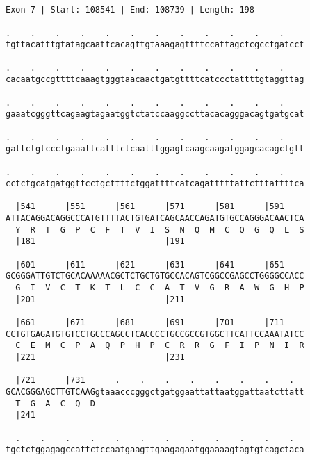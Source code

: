 \documentclass{article}
\begin{document}
\begin{Verbatim}
                                    
 
Exon 7 | Start: 108541 | End: 108739 | Length: 198
 
.    .    .    .    .    .    .    .    .    .    .    .    
tgttacatttgtatagcaattcacagttgtaaagagttttccattagctcgcctgatcct
                                                            
.    .    .    .    .    .    .    .    .    .    .    .    
cacaatgccgttttcaaagtgggtaacaactgatgttttcatccctattttgtaggttag
                                                            
.    .    .    .    .    .    .    .    .    .    .    .    
gaaatcgggttcagaagtagaatggtctatccaaggccttacacagggacagtgatgcat
                                                            
.    .    .    .    .    .    .    .    .    .    .    .    
gattctgtccctgaaattcatttctcaatttggagtcaagcaagatggagcacagctgtt
                                                            
.    .    .    .    .    .    .    .    .    .    .    .    
cctctgcatgatggttcctgcttttctggattttcatcagatttttattctttattttca
                                                            
  |541      |551      |561      |571      |581      |591    
ATTACAGGACAGGCCCATGTTTTACTGTGATCAGCAACCAGATGTGCCAGGGACAACTCA
  Y  R  T  G  P  C  F  T  V  I  S  N  Q  M  C  Q  G  Q  L  S
  |181                          |191                        
  
  |601      |611      |621      |631      |641      |651    
GCGGGATTGTCTGCACAAAAACGCTCTGCTGTGCCACAGTCGGCCGAGCCTGGGGCCACC
  G  I  V  C  T  K  T  L  C  C  A  T  V  G  R  A  W  G  H  P
  |201                          |211                        
  
  |661      |671      |681      |691      |701      |711    
CCTGTGAGATGTGTCCTGCCCAGCCTCACCCCTGCCGCCGTGGCTTCATTCCAAATATCC
  C  E  M  C  P  A  Q  P  H  P  C  R  R  G  F  I  P  N  I  R
  |221                          |231                        
  
  |721      |731      .    .    .    .    .    .    .    .  
GCACGGGAGCTTGTCAAGgtaaacccgggctgatggaattattaatggattaatcttatt
  T  G  A  C  Q  D                                          
  |241                                                      
  
  .    .    .    .    .    .    .    .    .    .    .    .  
tgctctggagagccattctccaatgaagttgaagagaatggaaaagtagtgtcagctaca
                                                            

\end{Verbatim}
\end{document}
